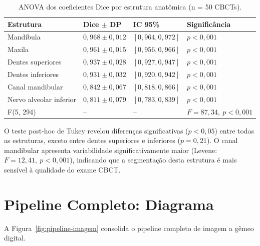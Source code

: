 \begin{longtable}{p{3.5cm}p{2cm}p{2cm}p{2.5cm}}
\caption{ANOVA dos coeficientes Dice por estrutura anatômica (n = 50 CBCTs).}
\label{tab:anova-dices}\\
\toprule
\textbf{Estrutura} & \textbf{Dice $\pm$ DP} & \textbf{IC 95\%} & \textbf{Significância} \\
\midrule
Mandíbula & $0,968 \pm 0,012$ & $[0,964, 0,972]$ & $p < 0,001$ \\
Maxila & $0,961 \pm 0,015$ & $[0,956, 0,966]$ & $p < 0,001$ \\
Dentes superiores & $0,937 \pm 0,028$ & $[0,927, 0,947]$ & $p < 0,001$ \\
Dentes inferiores & $0,931 \pm 0,032$ & $[0,920, 0,942]$ & $p < 0,001$ \\
Canal mandibular & $0,842 \pm 0,067$ & $[0,818, 0,866]$ & $p < 0,001$ \\
Nervo alveolar inferior & $0,811 \pm 0,079$ & $[0,783, 0,839]$ & $p < 0,001$ \\
\midrule
F(5, 294) & -- & -- & $F = 87,34,\ p < 0,001$ \\
\bottomrule
\end{longtable}

O teste post-hoc de Tukey revelou diferenças significativas ($p < 0,05$) entre todas as estruturas, exceto entre dentes superiores e inferiores ($p = 0,21$). O canal mandibular apresenta variabilidade significativamente maior (Levene: $F = 12,41,\ p < 0,001$), indicando que a segmentação desta estrutura é mais sensível à qualidade do exame CBCT.

\section{Pipeline Completo: Diagrama}
\label{sec:pipeline-diagrama}

A Figura~\ref{fig:pipeline-imagem} consolida o pipeline completo de imagem a gêmeo digital.

